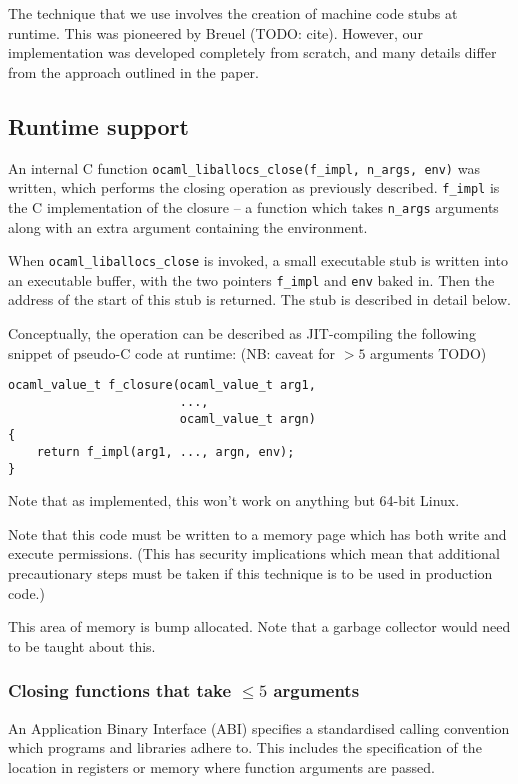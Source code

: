 \documentclass[12pt,a4paper,twoside,openright]{report}
\begin{document}
The technique that we use involves the creation of machine code stubs at
runtime. This was pioneered by Breuel (TODO: cite). However, our implementation
was developed completely from scratch, and many details differ from the
approach outlined in the paper.

\subsection{Runtime support}

An internal C function \lstinline{ocaml_liballocs_close(f_impl, n_args, env)}
was written, which performs the closing operation as previously described.
\lstinline!f_impl! is the C implementation of the closure -- a function which
takes \lstinline!n_args! arguments along with an extra argument containing the environment.

When \lstinline!ocaml_liballocs_close! is
invoked, a small executable stub is written into an executable
buffer, with the two pointers \lstinline!f_impl! and \lstinline!env! baked in.
Then the address of the start of this stub is returned. The stub is described
in detail below.

Conceptually, the operation can be described as JIT-compiling the following
snippet of pseudo-C code at runtime: (NB: caveat for $> 5$ arguments TODO)

\begin{lstlisting}
ocaml_value_t f_closure(ocaml_value_t arg1,
                        ...,
                        ocaml_value_t argn)
{
    return f_impl(arg1, ..., argn, env);
}
\end{lstlisting}

Note that as implemented, this won't work on anything but 64-bit Linux.

Note that this code must be written to a memory page which has both write and
execute permissions. (This has security implications which mean that additional
precautionary steps must be taken if this technique is to be used in production
code.)

This area of memory is bump allocated. Note that a garbage collector would need
to be taught about this.

\subsubsection{Closing functions that take $\le 5$ arguments}

An Application Binary Interface (ABI) specifies a standardised calling
convention which programs and libraries adhere to. This includes the
specification of the location in registers or memory where function arguments
are passed.
\end{document}
